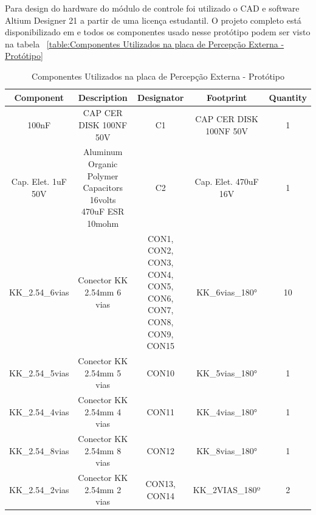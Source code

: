 \documentclass[../delivery_hospital_report.tex]{subfiles}
\begin{document}
Para design do hardware do módulo de controle foi utilizado o CAD e software Altium Designer 21 \cite{altium21} a partir de uma licença estudantil. O projeto completo está disponibilizado em \cite{github_modulos} e todos os componentes usado nesse protótipo podem ser visto na tabela ~\ref{table:Componentes Utilizados na placa de Percepção Externa - Protótipo}

\begin{table}[!ht]
\caption{Componentes Utilizados na placa de Percepção Externa - Protótipo}
\centering
\begin{adjustbox}{width=\columnwidth,center}
\begin{tabular}{|c|c|c|c|c|}
\hline
Component                     & Description                                                    & Designator                                                    & Footprint                   & Quantity \\ \hline
100nF                       & CAP CER DISK 100NF   50V                                       & C1                                                            & CAP CER DISK 100NF   50V    & 1        \\ \hline
Cap. Elet. 1uF   50V        & Aluminum Organic   Polymer Capacitors 16volts 470uF ESR 10mohm & C2                                                            & Cap. Elet. 470uF 16V        & 1        \\ \hline
KK\_2.54\_6vias             & Conector KK 2.54mm 6   vias                                    & CON1, CON2, CON3,   CON4, CON5, CON6, CON7, CON8, CON9, CON15 & KK\_6vias\_180°             & 10       \\ \hline
KK\_2.54\_5vias             & Conector KK 2.54mm 5   vias                                    & CON10                                                         & KK\_5vias\_180°             & 1        \\ \hline
KK\_2.54\_4vias             & Conector KK 2.54mm 4   vias                                    & CON11                                                         & KK\_4vias\_180°             & 1        \\ \hline
KK\_2.54\_8vias             & Conector KK 2.54mm 8   vias                                    & CON12                                                         & KK\_8vias\_180°             & 1        \\ \hline
KK\_2.54\_2vias             & Conector KK 2.54mm 2   vias                                    & CON13, CON14                                                  & KK\_2VIAS\_180º             & 2        \\ \hline

\end{tabular}
\end{adjustbox}
\end{table}
\end{document}
